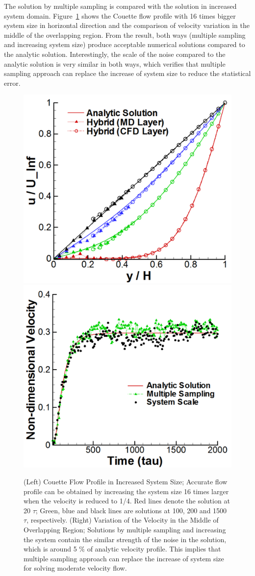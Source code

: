 \documentclass[preprint,12pt]{elsarticle}
\begin{document}
The solution by multiple sampling is compared with the solution in increased system domain. Figure~\ref{increase_system} shows the Couette flow profile with 16 times bigger system size in horizontal direction and the comparison of velocity variation in the middle of the overlapping region. From the result, both ways (multiple sampling and increasing system size) produce acceptable numerical solutions compared to the analytic solution. Interestingly, the scale of the noise compared to the analytic solution is very similar in both ways, which verifies that multiple sampling approach can replace the increase of system size to reduce the statistical error.

\begin{figure}
\centering
\includegraphics[width=0.6\linewidth]{Couette_025_Scale16.pdf}
\hskip 1cm
\includegraphics[width=0.6\linewidth]{Couette_025_Temporal_Multiset_VS_Scaleup.pdf}
\vskip-0.2cm
\caption{\small (Left) Couette Flow Profile in Increased System Size; Accurate flow profile can be obtained by increasing the system size 16 times larger when the velocity is reduced to 1/4. Red lines denote the solution at 20 $\tau$; Green, blue and black lines are solutions at 100, 200 and 1500 $\tau$, respectively. (Right) Variation of the Velocity in the Middle of Overlapping Region; Solutions by multiple sampling and increasing the system contain the similar strength of the noise in the solution, which is around 5 $\%$ of analytic velocity profile. This implies that multiple sampling approach can replace the increase of system size for solving moderate velocity flow.}
\label{increase_system}
\end{figure}
\end{document}
